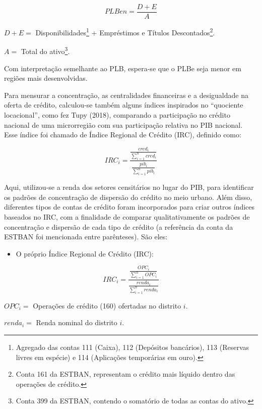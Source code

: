 \documentclass[a4paper,12pt]{article}
\providecommand{\tightlist}{%
  \setlength{\itemsep}{0pt}\setlength{\parskip}{0pt}}\usepackage{longtable,booktabs,array}
\begin{document}
\begin{equation}
PLBen = \frac{D + E}{A}
\end{equation}

\(D + E =\) Disponibilidades\footnote{Agregado das contas 111 (Caixa),
  112 (Depósitos bancários), 113 (Reservas livres em espécie) e 114
  (Aplicações temporárias em ouro).} + Empréstimos e Títulos
Descontados\footnote{Conta 161 da ESTBAN, representam o crédito mais
  líquido dentro das operações de crédito.}.

\(A =\) Total do ativo\footnote{Conta 399 da ESTBAN, contendo o
  somatório de todas as contas do ativo.}.

Com interpretação semelhante ao PLB, espera-se que o PLBe seja menor em
regiões mais desenvolvidas.

Para mensurar a concentração, as centralidades financeiras e a
desigualdade na oferta de crédito, calculou-se também alguns índices
inspirados no ``quociente locacional'', como fez Tupy (2018), comparando
a participação no crédito nacional de uma microrregião com sua
participação relativa no PIB nacional. Esse índice foi chamado de Índice
Regional de Crédito (IRC), definido como:

\begin{equation}
IRC_{i} = \frac{\frac{cred_i}{\sum_{i=1}^n cred_i}}{\frac{pib_i}{\sum_{i=1}^n pib_i}}
\end{equation}

Aqui, utilizou-se a renda dos setores censitários no lugar do PIB, para
identificar os padrões de concentração de dispersão do crédito no meio
urbano. Além disso, diferentes tipos de contas de crédito foram
incorporados para criar outros índices baseados no IRC, com a finalidade
de comparar qualitativamente os padrões de concentração e dispersão de
cada tipo de crédito (a referência da conta da ESTBAN foi mencionada
entre parênteses). São eles:

\begin{itemize}
\tightlist
\item
  O próprio Índice Regional de Crédito (IRC):
\end{itemize}

\begin{equation}
IRC_{i} = \frac{\frac{OPC_i}{\sum_{i=1}^n OPC_i}}{\frac{renda_i}{\sum_{i=1}^n renda_i}}
\end{equation}

\(OPC_i =\) Operações de crédito (160) ofertadas no distrito \(i\).

\(renda_i =\) Renda nominal do distrito \(i\).
\end{document}
